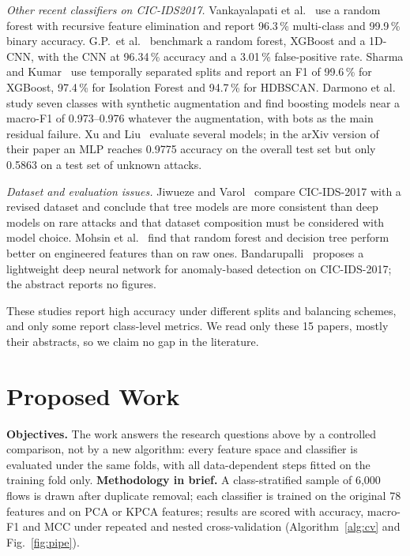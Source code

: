 \documentclass[runningheads]{llncs}
\begin{document}
\textit{Other recent classifiers on CIC-IDS2017.} Vankayalapati et al.~\cite{vank} use a random forest with recursive feature elimination and report 96.3\,\% multi-class and 99.9\,\% binary accuracy. G.P.\ et al.~\cite{gp} benchmark a random forest, XGBoost and a 1D-CNN, with the CNN at 96.34\,\% accuracy and a 3.01\,\% false-positive rate. Sharma and Kumar~\cite{sharma} use temporally separated splits and report an F1 of 99.6\,\% for XGBoost, 97.4\,\% for Isolation Forest and 94.7\,\% for HDBSCAN. Darmono et al.~\cite{darmono} study seven classes with synthetic augmentation and find boosting models near a macro-F1 of 0.973--0.976 whatever the augmentation, with bots as the main residual failure. Xu and Liu~\cite{xu} evaluate several models; in the arXiv version of their paper an MLP reaches 0.9775 accuracy on the overall test set but only 0.5863 on a test set of unknown attacks.

\textit{Dataset and evaluation issues.} Jiwueze and Varol~\cite{jiwueze} compare CIC-IDS-2017 with a revised dataset and conclude that tree models are more consistent than deep models on rare attacks and that dataset composition must be considered with model choice. Mohsin et al.~\cite{mohsin} find that random forest and decision tree perform better on engineered features than on raw ones. Bandarupalli~\cite{bandar} proposes a lightweight deep neural network for anomaly-based detection on CIC-IDS-2017; the abstract reports no figures.

These studies report high accuracy under different splits and balancing schemes, and only some report class-level metrics. We read only these 15 papers, mostly their abstracts, so we claim no gap in the literature.



\section{Proposed Work}\label{sec:proposed}
\textbf{Objectives.} The work answers the research questions above by a controlled comparison, not by a new algorithm: every feature space and classifier is evaluated under the same folds, with all data-dependent steps fitted on the training fold only. \textbf{Methodology in brief.} A class-stratified sample of 6{,}000 flows is drawn after duplicate removal; each classifier is trained on the original 78 features and on PCA or KPCA features; results are scored with accuracy, macro-F1 and MCC under repeated and nested cross-validation (Algorithm~\ref{alg:cv} and Fig.~\ref{fig:pipe}).
\end{document}
